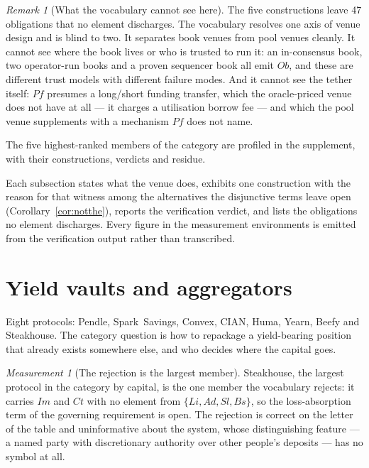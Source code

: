 \documentclass[11pt,reqno]{amsart}
\theoremstyle{plain}
\theoremstyle{definition}
\theoremstyle{remark}
\newtheorem{measurement}[theorem]{Measurement}
\newtheorem{remark}[theorem]{Remark}
\begin{document}
\begin{remark}[What the vocabulary cannot see here]
The five constructions leave 47 obligations that no element discharges. The vocabulary resolves one axis of venue design and
is blind to two. It separates book venues from pool venues cleanly. It cannot
see where the book lives or who is trusted to run it: an in-consensus book, two
operator-run books and a proven sequencer book all emit $Ob$, and these are
different trust models with different failure modes. And it cannot see the
tether itself: $Pf$ presumes a long/short funding transfer, which the
oracle-priced venue does not have at all --- it charges a utilisation borrow fee
--- and which the pool venue supplements with a mechanism $Pf$ does not name.
\end{remark}

The five highest-ranked members of the category are profiled in the
supplement, with their constructions, verdicts and residue.

Each
subsection states what the venue does, exhibits one construction with the reason
for that witness among the alternatives the disjunctive terms leave open
(Corollary~\ref{cor:notthe}), reports the verification verdict, and lists the
obligations no element discharges. Every figure in the measurement environments
is emitted from the verification output rather than transcribed.

\section{Yield vaults and aggregators}\label{sec:cat:yield}

Eight protocols: Pendle, Spark~Savings, Convex, CIAN, Huma, Yearn, Beefy and
Steakhouse. The category question is how to repackage a yield-bearing position
that already exists somewhere else, and who decides where the capital goes.

\begin{measurement}[The rejection is the largest member]\label{meas:cat:yieldrej}
Steakhouse, the largest protocol in the category by capital, is the one member
the vocabulary rejects: it carries $Im$ and $Ct$ with no element from
$\{Li, Ad, Sl, Bs\}$, so the loss-absorption term of the governing requirement
is open. The rejection is correct on the letter of the table and uninformative
about the system, whose distinguishing feature --- a named party with
discretionary authority over other people's deposits --- has no symbol at all.
\end{measurement}
\end{document}

